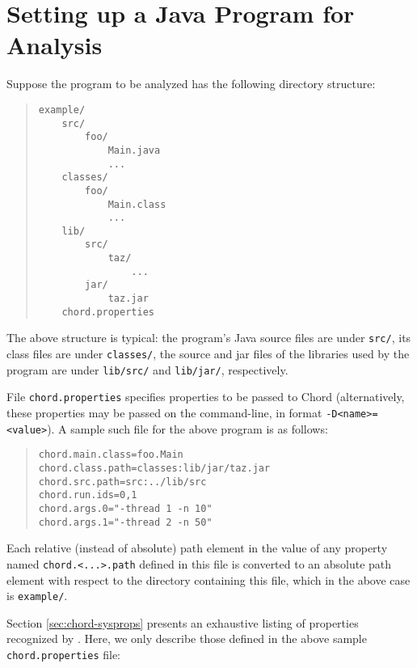 \section{Setting up a Java Program for Analysis}
\label{sec:program-setup}

Suppose the program to be analyzed has the following directory structure:

\begin{quote}
\begin{verbatim}
example/
    src/
        foo/
            Main.java
            ...
    classes/
        foo/
            Main.class
            ...
    lib/
        src/
            taz/
                ...
        jar/
            taz.jar
    chord.properties
\end{verbatim}
\end{quote}

The above structure is typical: the program's Java source files are under \verb+src/+,
its class files are under \verb+classes/+, the source and jar files of the libraries
used by the program are under \verb+lib/src/+ and \verb+lib/jar/+, respectively.

File \verb+chord.properties+ specifies properties to be passed to Chord (alternatively,
these properties may be passed on the command-line, in format \verb+-D<name>=<value>+).
A sample such file for the above program is as follows:

\begin{quote}
\begin{verbatim}
chord.main.class=foo.Main
chord.class.path=classes:lib/jar/taz.jar
chord.src.path=src:../lib/src
chord.run.ids=0,1
chord.args.0="-thread 1 -n 10"
chord.args.1="-thread 2 -n 50"
\end{verbatim}
\end{quote}

Each relative (instead of absolute) path element in the value of any property
named \verb+chord.<...>.path+ defined in this file is converted to an absolute path element with respect
to the directory containing this file, which in the above case is \verb+example/+.

Section \ref{sec:chord-sysprops} presents an exhaustive
listing of properties recognized by \Chord.
Here, we only describe those defined in the above
sample \verb+chord.properties+ file:


